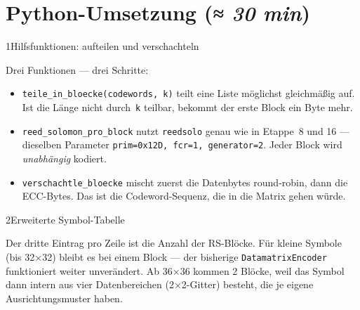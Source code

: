 \section{Python-Umsetzung \normalfont(\textit{≈ 30 min})}

\begin{pythoneinheit}{1}{Hilfsfunktionen: aufteilen und verschachteln}

Drei Funktionen — drei Schritte:

\begin{itemize}
\item \texttt{teile\_in\_bloecke(codewords, k)} teilt eine Liste möglichst
  gleichmäßig auf. Ist die Länge nicht durch~\texttt{k} teilbar, bekommt
  der erste Block ein Byte mehr.
\item \texttt{reed\_solomon\_pro\_block} nutzt \texttt{reedsolo} genau
  wie in Etappe~8 und 16 — dieselben Parameter \texttt{prim=0x12D,
  fcr=1, generator=2}. Jeder Block wird \emph{unabhängig} kodiert.
\item \texttt{verschachtle\_bloecke} mischt zuerst die Datenbytes
  round-robin, dann die ECC-Bytes. Das ist die Codeword-Sequenz, die
  in die Matrix gehen würde.
\end{itemize}
\end{pythoneinheit}

\begin{pythoneinheit}{2}{Erweiterte Symbol-Tabelle}

Der dritte Eintrag pro Zeile ist die Anzahl der RS-Blöcke. Für kleine
Symbole (bis 32×32) bleibt es bei einem Block — der bisherige
\texttt{DatamatrixEncoder} funktioniert weiter unverändert. Ab 36×36
kommen 2 Blöcke, weil das Symbol dann intern aus vier
Datenbereichen (2×2-Gitter) besteht, die je eigene Ausrichtungs\-muster
haben.
\end{pythoneinheit}

